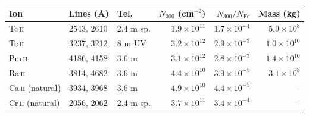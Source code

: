 \begin{tabular}{lllrrr}
\toprule
Ion & Lines (\AA) & Tel. & $N_{300}$ (cm$^{-2}$) & $N_{300}/N_\mathrm{Fe}$ & Mass (kg) \\
\midrule
Tc\,\textsc{ii} & 2543, 2610 & 2.4 m sp. & $1.9\times10^{11}$ & $1.7\times10^{-4}$ & $5.9\times10^{8}$ \\
Tc\,\textsc{ii} & 3237, 3212 & 8 m UV & $3.2\times10^{12}$ & $2.9\times10^{-3}$ & $1.0\times10^{10}$ \\
Pm\,\textsc{ii} & 4186, 4158 & 3.6 m & $3.1\times10^{12}$ & $2.8\times10^{-3}$ & $1.4\times10^{10}$ \\
Ra\,\textsc{ii} & 3814, 4682 & 3.6 m & $4.4\times10^{10}$ & $3.9\times10^{-5}$ & $3.1\times10^{8}$ \\
Ca\,\textsc{ii} (natural) & 3934, 3968 & 3.6 m & $4.9\times10^{10}$ & $4.4\times10^{-5}$ & -- \\
Cr\,\textsc{ii} (natural) & 2056, 2062 & 2.4 m sp. & $3.7\times10^{11}$ & $3.4\times10^{-4}$ & -- \\
\bottomrule
\end{tabular}
